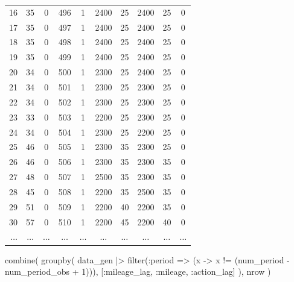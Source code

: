 \documentclass[
  letterpaper,
  DIV=11,
  numbers=noendperiod]{scrreprt}
\newenvironment{Shaded}{\begin{snugshade}}{\end{snugshade}}
\newcommand{\FloatTok}[1]{\textcolor[rgb]{0.68,0.00,0.00}{#1}}
\newcommand{\FunctionTok}[1]{\textcolor[rgb]{0.28,0.35,0.67}{#1}}
\newcommand{\NormalTok}[1]{\textcolor[rgb]{0.00,0.23,0.31}{#1}}
\newcommand{\OperatorTok}[1]{\textcolor[rgb]{0.37,0.37,0.37}{#1}}
\begin{document}
\begin{tabular}{r|ccccccccc}
    16 & 35 & 0 & 496 & 1 & 2400 & 25 & 2400 & 25 & 0 \\
    17 & 35 & 0 & 497 & 1 & 2400 & 25 & 2400 & 25 & 0 \\
    18 & 35 & 0 & 498 & 1 & 2400 & 25 & 2400 & 25 & 0 \\
    19 & 35 & 0 & 499 & 1 & 2400 & 25 & 2400 & 25 & 0 \\
    20 & 34 & 0 & 500 & 1 & 2300 & 25 & 2400 & 25 & 0 \\
    21 & 34 & 0 & 501 & 1 & 2300 & 25 & 2300 & 25 & 0 \\
    22 & 34 & 0 & 502 & 1 & 2300 & 25 & 2300 & 25 & 0 \\
    23 & 33 & 0 & 503 & 1 & 2200 & 25 & 2300 & 25 & 0 \\
    24 & 34 & 0 & 504 & 1 & 2300 & 25 & 2200 & 25 & 0 \\
    25 & 46 & 0 & 505 & 1 & 2300 & 35 & 2300 & 25 & 0 \\
    26 & 46 & 0 & 506 & 1 & 2300 & 35 & 2300 & 35 & 0 \\
    27 & 48 & 0 & 507 & 1 & 2500 & 35 & 2300 & 35 & 0 \\
    28 & 45 & 0 & 508 & 1 & 2200 & 35 & 2500 & 35 & 0 \\
    29 & 51 & 0 & 509 & 1 & 2200 & 40 & 2200 & 35 & 0 \\
    30 & 57 & 0 & 510 & 1 & 2200 & 45 & 2200 & 40 & 0 \\
    $\dots$ & $\dots$ & $\dots$ & $\dots$ & $\dots$ & $\dots$ & $\dots$ & $\dots$ & $\dots$ & $\dots$ \\
\end{tabular}

\begin{Shaded}
\begin{Highlighting}[]
\FunctionTok{combine}\NormalTok{(}
    \FunctionTok{groupby}\NormalTok{(}
\NormalTok{        data\_gen }\OperatorTok{|\textgreater{}}
            \FunctionTok{filter}\NormalTok{(}\OperatorTok{:}\NormalTok{period }\OperatorTok{=\textgreater{}}\NormalTok{ (x }\OperatorTok{{-}\textgreater{}}\NormalTok{ x }\OperatorTok{!=}\NormalTok{ (num\_period }\OperatorTok{{-}}\NormalTok{ num\_period\_obs }\OperatorTok{+} \FloatTok{1}\NormalTok{))),}
\NormalTok{        [}\OperatorTok{:}\NormalTok{mileage\_lag, }\OperatorTok{:}\NormalTok{mileage, }\OperatorTok{:}\NormalTok{action\_lag]}
\NormalTok{    ),}
\NormalTok{    nrow}
\NormalTok{)}
\end{Highlighting}
\end{Shaded}
\end{document}
